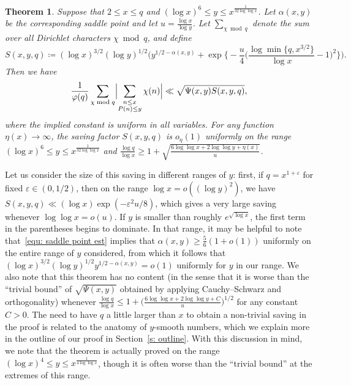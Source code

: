 \documentclass[a4paper,12pt,reqno]{amsart}
\newtheorem{theorem}{Theorem}
\begin{document}
\begin{theorem}\label{t: main}
Suppose that $2 \leq x \leq q$ and $(\log x)^6 \leq y \leq x^{\frac{1}{32 \log \log x}}$. Let $\alpha (x,y)$ be the corresponding saddle point and let $u = \frac{\log x}{\log y}$. Let $\sum_{\chi \bmod q}$ denote the sum over all Dirichlet characters $\chi \bmod q$, and define
\[
S(x,y,q) \coloneqq (\log x)^{3/2} (\log y)^{1/2} \biggl( y^{1/2 - \alpha(x,y)} +  \exp \biggl\{ - \frac{u}{4} \biggl( \frac{\log \min\{ q, x^{3/2} \}}{\log x} - 1 \biggr)^2  \biggr\} \biggr).
\]
Then we have
\[
\frac{1}{\varphi(q)} \sum_{\chi \bmod q} \Bigl| \sum_{\substack{n \leq x \\ P(n) \leq y}} \chi(n) \Bigr| \ll \sqrt{\Psi(x,y)S(x,y,q)},
\]
where the implied constant is uniform in all variables. For any function $\eta(x) \rightarrow \infty$, the saving factor $S(x,y,q)$ is $o_{\eta} (1)$ uniformly on the range $(\log x)^{6} \leq y \leq x^{\frac{1}{32 \log \log x}}$ and $ \frac{\log q}{\log x} \geq 1 + \sqrt{\frac{6 \log \log x + 2 \log \log y + \eta (x)}{u}}$.
\end{theorem}

Let us consider the size of this saving in different ranges of $y$: first, if $q = x^{1 + \varepsilon}$ for fixed $\varepsilon \in (0,1/2)$, then on the range $\log x  = o( (\log y )^2 )$, we have $S(x,y,q) \ll (\log x) \exp (- \varepsilon^2 u/8)$, which gives a very large saving whenever $\log \log x = o(u)$. If $y$ is smaller than roughly $e^{\sqrt{\log x}}$, the first term in the parentheses begins to dominate. In that range, it may be helpful to note that~\eqref{equ: saddle point est} implies that $\alpha(x,y) \geq \frac{5}{6} (1+o(1))$ uniformly on the entire range of $y$ considered, from which it follows that $(\log x)^{3/2} (\log y)^{1/2} y^{1/2 - \alpha (x,y)} = o(1)$ uniformly for $y$ in our range. We also note that this theorem has no content (in the sense that it is worse than the ``trivial bound'' of $\sqrt{\Psi (x,y)}$ obtained by applying Cauchy--Schwarz and orthogonality) whenever $\frac{\log q}{\log x} \leq 1 + \bigl(\frac{6 \log \log x + 2 \log \log y + C}{u}\bigr)^{1/2}$ for any constant $C > 0$. The need to have $q$ a little larger than $x$ to obtain a non-trivial saving in the proof is related to the anatomy of $y$-smooth numbers, which we explain more in the outline of our proof in Section~\ref{s: outline}. With this discussion in mind, we note that the theorem is actually proved on the range $(\log x)^4 \leq y \leq x^{\frac{1}{4 \log \log x}}$, though it is often worse than the ``trivial bound'' at the extremes of this range.
\end{document}
